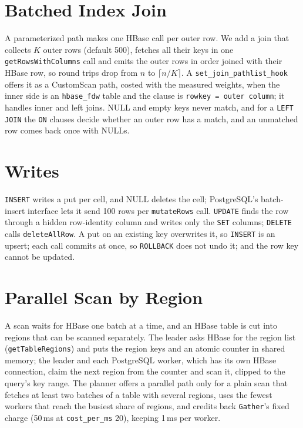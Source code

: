 \documentclass[11pt,a4paper]{article}
\newcommand{\code}[1]{\texttt{#1}}
\begin{document}
\section{Batched Index Join}
\label{sec:batch}
A parameterized path makes one HBase call per outer row. We add a join that collects $K$ outer rows (default 500), fetches all their keys in one \code{getRowsWithColumns} call and emits the outer rows in order joined with their HBase row, so round trips drop from $n$ to $\lceil n/K \rceil$. A \code{set\_join\_pathlist\_hook} offers it as a CustomScan path, costed with the measured weights, when the inner side is an \code{hbase\_fdw} table and the clause is \code{rowkey = outer column}; it handles inner and left joins. NULL and empty keys never match, and for a \code{LEFT JOIN} the \code{ON} clauses decide whether an outer row has a match, and an unmatched row comes back once with NULLs.

\section{Writes}
\label{sec:writes}
\code{INSERT} writes a put per cell, and NULL deletes the cell; PostgreSQL's batch-insert interface lets it send 100 rows per \code{mutateRows} call. \code{UPDATE} finds the row through a hidden row-identity column and writes only the \code{SET} columns; \code{DELETE} calls \code{deleteAllRow}. A put on an existing key overwrites it, so \code{INSERT} is an upsert; each call commits at once, so \code{ROLLBACK} does not undo it; and the row key cannot be updated.

\section{Parallel Scan by Region}
\label{sec:parallel}
A scan waits for HBase one batch at a time, and an HBase table is cut into regions that can be scanned separately. The leader asks HBase for the region list (\code{getTableRegions}) and puts the region keys and an atomic counter in shared memory; the leader and each PostgreSQL worker, which has its own HBase connection, claim the next region from the counter and scan it, clipped to the query's key range. The planner offers a parallel path only for a plain scan that fetches at least two batches of a table with several regions, uses the fewest workers that reach the busiest share of regions, and credits back \code{Gather}'s fixed charge (50\,ms at \code{cost\_per\_ms} 20), keeping 1\,ms per worker.
\end{document}
